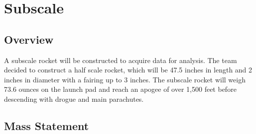 \section{Subscale}
\subsection{Overview}
A subscale rocket will be constructed to acquire data for analysis. The team decided to construct a half scale rocket, which will be 47.5 inches in length and 2 inches in diameter with a fairing up to 3 inches. The subscale rocket will weigh 73.6 ounces on the launch pad and reach an apogee of over 1,500 feet before descending with drogue and main parachutes.
    

 \subsection{Mass Statement}

